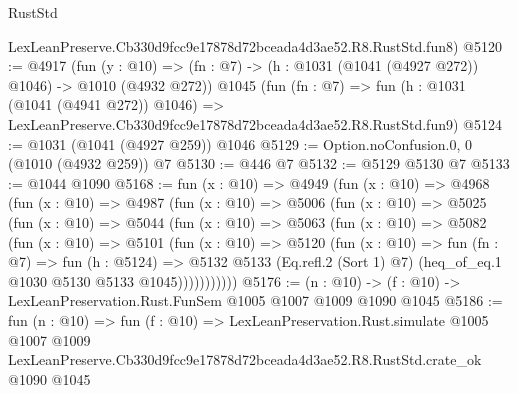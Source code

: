 \begin{lexlean}{RustStd}
\begin{coremodule}
    LexLeanPreserve.Cb330d9fcc9e17878d72bceada4d3ae52.R8.RustStd.fun8)
@5120 := @4917
    (fun (y : @10) => (fn : @7) -> (h : @1031 (@1041 (@4927 @272)) @1046) -> @1010 (@4932 @272))
    @1045
    (fun (fn : @7) =>
    fun (h : @1031 (@1041 (@4941 @272)) @1046) =>
    LexLeanPreserve.Cb330d9fcc9e17878d72bceada4d3ae52.R8.RustStd.fun9)
@5124 := @1031 (@1041 (@4927 @259)) @1046
@5129 := Option.noConfusion.{0, 0} (@1010 (@4932 @259)) @7
@5130 := @446 @7
@5132 := @5129 @5130 @7
@5133 := @1044 @1090
@5168 := fun (x : @10) =>
  @4949
    (fun (x : @10) =>
    @4968
      (fun (x : @10) =>
      @4987
        (fun (x : @10) =>
        @5006
          (fun (x : @10) =>
          @5025
            (fun (x : @10) =>
            @5044
              (fun (x : @10) =>
              @5063
                (fun (x : @10) =>
                @5082
                  (fun (x : @10) =>
                  @5101
                    (fun (x : @10) =>
                    @5120
                      (fun (x : @10) =>
                      fun (fn : @7) =>
                      fun (h : @5124) =>
                      @5132
                        @5133
                        (Eq.refl.{2} (Sort 1) @7)
                        (heq_of_eq.{1} @1030 @5130 @5133 @1045)))))))))))
@5176 := (n : @10) -> (f : @10) -> LexLeanPreservation.Rust.FunSem @1005 @1007 @1009 @1090 @1045
@5186 := fun (n : @10) =>
  fun (f : @10) =>
  LexLeanPreservation.Rust.simulate
    @1005
    @1007
    @1009
    LexLeanPreserve.Cb330d9fcc9e17878d72bceada4d3ae52.R8.RustStd.crate_ok
    @1090
    @1045
\end{coremodule}
\end{lexlean}
